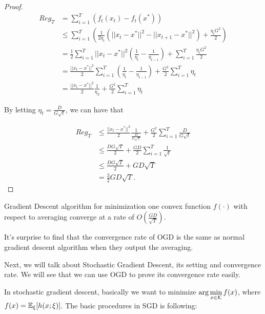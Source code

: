 \documentclass[../main.tex]{subfiles}
\begin{document}
\begin{proof}
	\begin{equation*}
		\begin{aligned}
			Reg_T & = \sum\limits_{i=1}^T (f_t(x_t) - f_t(x^*))\\
					& \leq \sum\limits_{i=1}^T ( \frac{1}{2\eta_t} ( || x_t - x^*||^2 -  ||x_{t+1} - x^*||^2 ) + \frac{\eta_t G^2}{2}) \\
					& = \frac{1}{2} \sum\limits_{i=1}^T || x_t - x^*||^2 (\frac{1}{\eta_t} -\frac{1}{\eta_{t-1}})  +  \sum\limits_{i=1}^T  \frac{\eta_t G^2}{2} \\
					& =  \frac{|| x_t - x^*||^2}{2} \sum\limits_{i=1}^T  (\frac{1}{\eta_t} -\frac{1}{\eta_{t-1}})  + \frac{ G^2}{2}  \sum\limits_{i=1}^T  \eta_t \\
					& = \frac{|| x_t - x^*||^2}{2} \frac{1}{\eta_T}  + \frac{ G^2}{2}  \sum\limits_{i=1}^T  \eta_t
		\end{aligned}
	\end{equation*}
	
	By letting $\eta_t = \frac{D}{G\sqrt{t}}$, we can have that
	
	\begin{equation*}
		\begin{aligned}
				Reg_T & \leq  \frac{|| x_t - x^*||^2}{2} \frac{1}{ \frac{D}{G\sqrt{T}}}  + \frac{ G^2}{2}  \sum\limits_{i=1}^T  \frac{D}{G\sqrt{t}} \\
				& \leq \frac{D G\sqrt{T}}{2}   + \frac{ GD}{2}  \sum\limits_{i=1}^T  \frac{1}{\sqrt{t}}\\
				& \leq \frac{D G\sqrt{T}}{2}   + GD  \sqrt{T} \\
				& = \frac{3}{2}  GD  \sqrt{T}.
		\end{aligned} 
	\end{equation*}
\end{proof}

\begin{corollary}
	Gradient Descent algorithm for minimization one convex function $f(\cdot)$ with respect to averaging converge at a rate of $O(\frac{GD}{\sqrt{T}})$.
\end{corollary}

It's surprise to find that the convergence rate of OGD is the same as normal gradient descent algorithm when they output the averaging.

Next, we will talk about Stochastic Gradient Descent, its setting and convergence rate. We will see that we can use OGD to prove its convergence rate easily.

In stochastic gradient descent, basically we want to minimize $\arg\min\limits_{x\in \mathcal{K}} f(x)$, where $f(x) = \mathbb{E}_{\xi}[h(x;\xi)]$. The basic procedures in SGD is following:
\end{document}
